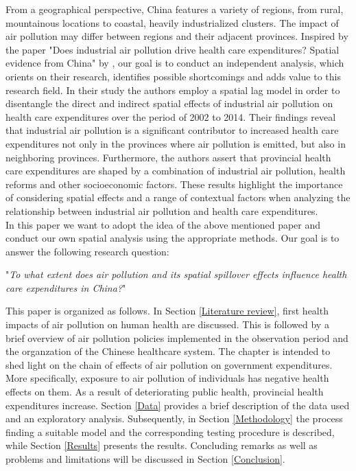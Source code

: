 \documentclass[
]{article}
\begin{document}
	From a geographical perspective, China features a variety of regions, from rural, mountainous locations to coastal, heavily industrialized clusters. The impact of air pollution may differ between regions and their adjacent provinces. Inspired by the paper "Does industrial air pollution drive health care expenditures? Spatial evidence from China" by \cite{zeng2019does}, our goal is to conduct an independent analysis, which orients on their research, identifies possible shortcomings and adds value to this research field. In their study the authors employ a spatial lag model in order to disentangle the direct and indirect spatial effects of industrial air pollution on health care expenditures over the period of 2002 to 2014. Their findings reveal that industrial air pollution is a significant contributor to increased health care expenditures not only in the provinces where air pollution is emitted, but also in neighboring provinces. Furthermore, the authors assert that provincial health care expenditures are shaped by a combination of industrial air pollution, health reforms and other socioeconomic factors. These results highlight the importance of considering spatial effects and a range of contextual factors when analyzing the relationship between industrial air pollution and health care expenditures. \\ %
	In this paper we want to adopt the idea of the above mentioned paper and conduct our own spatial analysis using the appropriate methods. Our goal is to answer the following research question:
	
	"\textit{To what extent does air pollution and its spatial spillover effects influence health care expenditures in China?}"
	
	This paper is organized as follows. In Section \ref{Literature review}, first health impacts of air pollution on human health are discussed. This is followed by a brief overview of air pollution policies implemented in the observation period and the organzation of the Chinese healthcare system. The chapter is intended to shed light on the chain of effects of air pollution on government expenditures. More specifically, exposure to air pollution of individuals has negative health effects on them. As a result of deteriorating public health, provincial health expenditures increase. 
	Section \ref{Data} provides a brief description of the data used and an exploratory analysis. 
	Subsequently, in Section \ref{Methodology} the process finding a suitable model and the corresponding testing procedure is described, while Section \ref{Results} presents the results. 
	Concluding remarks as well as problems and limitations will be discussed  in Section \ref{Conclusion}. 
	
\end{document}
